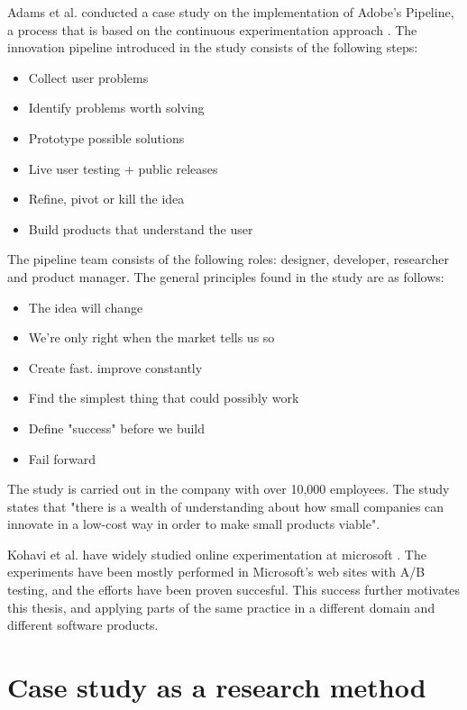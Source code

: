 \documentclass[english]{tktltiki2}
\theoremstyle{definition}
\theoremstyle{remark}
\begin{document}
Adams et al. conducted a case study on the implementation of Adobe's Pipeline, a process that is based on the continuous experimentation approach \cite{adams2013creating, adobe}. The innovation pipeline introduced in the study consists of the following steps:
\begin{itemize}
\item Collect user problems
\item Identify problems worth solving
\item Prototype possible solutions
\item Live user testing + public releases
\item Refine, pivot or kill the idea
\item Build products that understand the user
\end{itemize}
The pipeline team consists of the following roles: designer, developer, researcher and product manager. The general principles found in the study are as follows:
\begin{itemize}
\item The idea will change
\item We're only right when the market tells us so
\item Create fast. improve constantly
\item Find the simplest thing that could possibly work
\item Define "success" before we build
\item Fail forward
\end{itemize}
The study is carried out in the company with over 10,000 employees. The study states that "there is a wealth of understanding about how small companies can innovate in a low-cost way in order to make small products viable". 

Kohavi et al. have widely studied online experimentation at microsoft \cite{kohavi2009online}. The experiments have been mostly performed in Microsoft's web sites with A/B testing, and the efforts have been proven succesful. This success further motivates this thesis, and applying parts of the same practice in a different domain and different software products.

\section{Case study as a research method}
\end{document}
